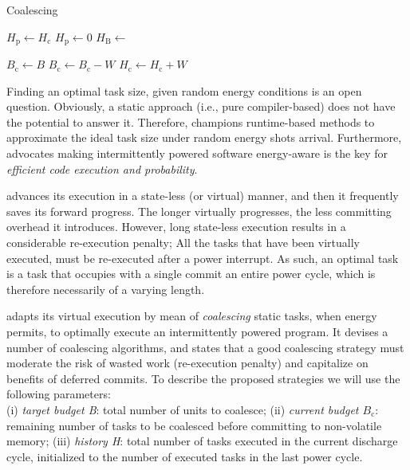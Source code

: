 \begin{algorithm}
	\caption{Coalescing}
	\label{algo:genCoalescing}
	\scriptsize
	\begin{algorithmic}[1]
        \State $H_\text{p} \gets H_\text{c}$
        \State $H_\text{p} \gets 0$ 
        \State $H_\text{B} \leftarrow $ 

	        \State $ B_\text{c} \gets B$
		        \State {}
		        \State $B_\text{c} \gets B_\text{c} - W$
				\State $H_\text{c} \gets H_\text{c} + W$
	        \EndWhile
	        \State {}
        \EndWhile
	\end{algorithmic}
\end{algorithm}

Finding an optimal task size, given random energy conditions is an open question. Obviously, a static approach (i.e., pure compiler-based) does not have the potential to answer it. Therefore, \sys champions runtime-based methods to approximate the ideal task size under random energy shots arrival. Furthermore, \sys advocates making intermittently powered software energy-aware is the key for \emph{efficient code execution and probability}.

\sys advances its execution in a state-less (or virtual) manner, and then it frequently saves its forward progress. The longer \sys virtually progresses, the less committing overhead it introduces. However, long state-less execution results in a considerable re-execution penalty; All the tasks that have been virtually executed, must be re-executed after a power interrupt. As such, an optimal task is a task that occupies with a single commit an entire power cycle, which is therefore necessarily of a varying length.  

\sys adapts its virtual execution by mean of \emph{coalescing} static tasks, when energy permits, to optimally execute an intermittently powered program. It devises a number of coalescing algorithms, and states that a good coalescing strategy must moderate the risk of wasted work (re-execution penalty) and capitalize on benefits of deferred commits. To describe the proposed strategies we will use the following parameters: \\
(i) \textit{target budget B}: total number of units to coalesce; (ii) \textit{current budget $B_\text{c}$}: remaining number of tasks to be coalesced before committing to non-volatile memory; (iii) \textit{history H}: total number of tasks executed in the current discharge cycle, initialized to the number of executed tasks in the last power cycle. 

